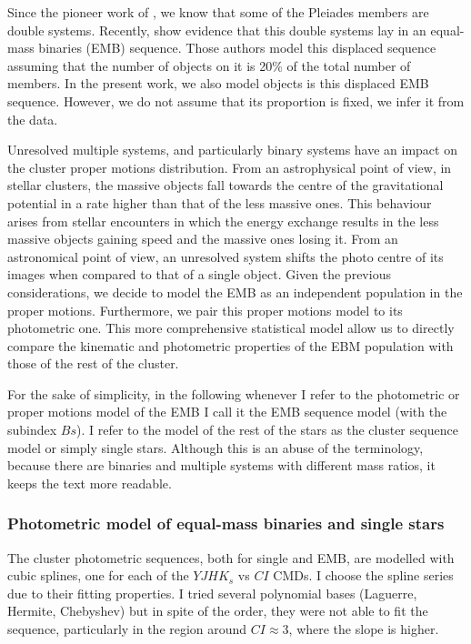 Since the pioneer work of \citet{Trumpler1921}, we know that some of the Pleiades members are double systems. Recently, \citet{Sarro2014} show evidence that this double systems lay in an equal-mass binaries (EMB) sequence. Those authors model this displaced sequence assuming that the number of objects on it is 20\% of the total number of members. In the present work, we also model objects is this displaced EMB sequence. However, we do not assume that its proportion is fixed, we infer it from the data. 

Unresolved multiple systems, and particularly binary systems have an impact on the cluster proper motions distribution. From an astrophysical point of view, in stellar clusters, the massive objects fall towards the centre of the gravitational potential in a rate higher than that of the less massive ones. This behaviour arises from stellar encounters in which the energy exchange results in the less massive objects gaining speed and the massive ones losing it. From an astronomical point of view, an unresolved system shifts the photo centre of its images when compared to that of a single object. Given the previous considerations, we decide to model the EMB as an independent population in the proper motions. Furthermore, we pair this proper motions model to its photometric one. This more comprehensive statistical model allow us to directly compare the kinematic and photometric properties of the EBM population with those of the rest of the cluster. 

For the sake of simplicity, in the following whenever I refer to the photometric or proper motions model of the EMB I call it the EMB sequence model (with the subindex $Bs$). I refer to the model of the rest of the stars as the cluster sequence model or simply single stars. Although this is an abuse of the terminology, because there are binaries and multiple systems with different mass ratios, it keeps the text more readable.

\subsubsection{Photometric model of equal-mass binaries and single stars}

The cluster photometric sequences, both for single and EMB, are modelled with cubic splines, one for each of the $YJHK_s$ vs $CI$ CMDs. I choose the spline series due to their fitting properties. I tried several polynomial bases (Laguerre, Hermite, Chebyshev) but in spite of the order, they were not able to fit the sequence, particularly in the region around $CI \approx 3$, where the slope is higher. 

